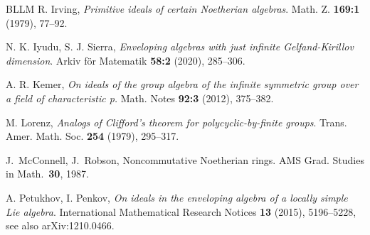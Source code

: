 \documentclass{amsart} \textwidth=18.0cm \oddsidemargin=-1cm \evensidemargin=-1cm \topmargin=-1cm \textheight=23cm
\theoremstyle{definition}
\begin{document}
\begin{thebibliography}{BLLM}
 R. Irving, {\em Primitive ideals of certain Noetherian algebras}. Math. Z. {\bf 169:1} (1979), 77--92.

 N. K. Iyudu, S. J. Sierra, {\em Enveloping algebras with just infinite Gelfand-Kirillov dimension}.  Arkiv f\"or Matematik {\bf 58:2} (2020), 285--306.

 A. R. Kemer, {\em On ideals of the group algebra of the infinite symmetric group over a field of characteristic p.} Math. Notes {\bf 92:3} (2012), 375--382.



 M. Lorenz, {\em Analogs of Clifford's theorem for polycyclic-by-finite groups}. Trans. Amer. Math. Soc. {\bf 254} (1979), 295--317.

 J.~McConnell, J.~Robson, Noncommutative Noetherian rings. AMS Grad. Studies in Math.~\textbf{30}, 1987.



 A. Petukhov, I. Penkov, {\em On ideals in the enveloping algebra of a locally simple Lie algebra}.  International Mathematical Research Notices {\bf 13} (2015), 5196--5228,  see also arXiv:1210.0466.



\end{thebibliography}
\end{document}
